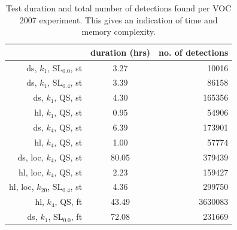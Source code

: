 \begin{table}[hbt]
    \centering
    \caption{Test duration and total number of detections found per VOC 2007 experiment. This gives an indication of time and memory complexity.}
    \label{tab:vocalldurdet}
    \begin{tabular}{rcr}
    ~&duration (hrs)&no. of detections\\
    \hline
    ds, $k_1$, SL$_{0.0}$, st&3.27&10016\\
    ds, $k_1$, SL$_{0.4}$, st&3.39&86158\\
    ds, $k_1$, QS, st&4.30&165356\\
    hl, $k_1$, QS, st&0.95&54906\\
    ds, $k_4$, QS, st&6.39&173901\\
    hl, $k_4$, QS, st&1.00&57774\\
    ds, loc, $k_4$, QS, st&80.05&379439\\
    hl, loc, $k_4$, QS, st&2.23&159427\\
    hl, loc, $k_{20}$, SL$_{0.4}$, st&4.36&299750\\
    hl, $k_4$, QS, ft&43.49&3630083\\
    ds, $k_1$, SL$_{0.0}$, ft&72.08&231669
    \end{tabular}
\end{table}


